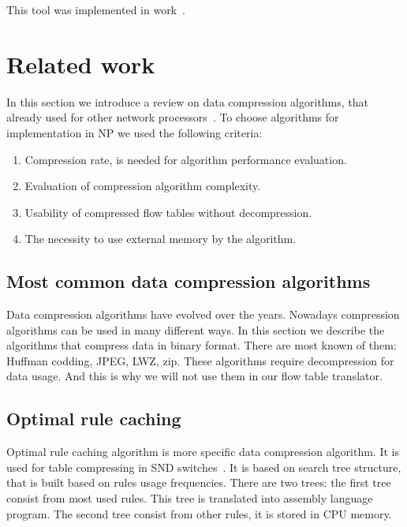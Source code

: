 \documentclass[conference]{IEEEtran}
\begin{document}
            This tool was implemented in work~\cite{andrewmonetec}.

    \section{Related work}
        In this section we  introduce a review on data compression algorithms, that already used
        for other network processors~\cite{braun2014wildcard}. 
        To choose algorithms for implementation in NP we used the following criteria:
        \begin{enumerate}
            \item Compression rate, is needed for algorithm performance evaluation.
            \item Evaluation of compression algorithm complexity.
            \item Usability of compressed flow tables without decompression.
            \item The necessity to use external memory by the algorithm.
        \end{enumerate}

        \subsection{Most common data compression algorithms}
            Data compression algorithms have evolved over the years. Nowadays compression 
            algorithms can be used in many different ways. In this section we describe
            the algorithms that compress data in binary format.
            There are most known of them: Huffman codding, JPEG, LWZ, zip.
            These algorithms require decompression for data usage. And this is why
            we will not use them in our flow table translator.
        
        \subsection{Optimal rule caching}
            Optimal rule caching algorithm is more specific data compression algorithm. 
            It is used for table compressing in SND switches~\cite{rottenstreich2016optimal}.
            It is based on search tree structure, that is built based on rules usage frequencies.
            There are two trees: the first tree consist from most used rules. This tree is translated into assembly
            language program. The second tree consist from other rules, it is stored in CPU memory.
        
\end{document}
